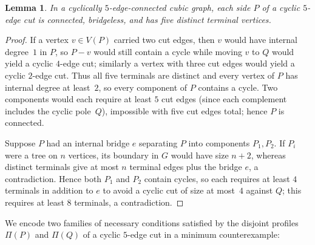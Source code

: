 \documentclass[11pt]{article}
\newtheorem{lemma}[theorem]{Lemma}
\theoremstyle{remark}
\begin{document}
\begin{lemma}\label{lem:pole-connected}
In a cyclically $5$-edge-connected cubic graph, each side $P$ of a cyclic $5$-edge cut is
connected, bridgeless, and has five distinct terminal vertices.
\end{lemma}

\begin{proof}
If a vertex $v \in V(P)$ carried two cut edges, then $v$ would have internal degree~$1$
in $P$, so $P - v$ would still contain a cycle while moving $v$ to $Q$ would yield a
cyclic $4$-edge cut; similarly a vertex with three cut edges would yield a cyclic
$2$-edge cut. Thus all five terminals are distinct and every vertex of $P$ has internal
degree at least~$2$, so every component of $P$ contains a cycle. Two components would
each require at least $5$ cut edges (since each complement includes the cyclic pole~$Q$),
impossible with five cut edges total; hence $P$ is connected.

Suppose $P$ had an internal bridge $e$ separating $P$ into components $P_1, P_2$. If
$P_i$ were a tree on $n$ vertices, its boundary in $G$ would have size $n + 2$, whereas
distinct terminals give at most $n$ terminal edges plus the bridge $e$, a contradiction.
Hence both $P_1$ and $P_2$ contain cycles, so each requires at least $4$ terminals in
addition to $e$ to avoid a cyclic cut of size at most~$4$ against $Q$; this requires at
least $8$ terminals, a contradiction.
\end{proof}

We encode two families of necessary conditions satisfied by the disjoint profiles
$\Pi(P)$ and $\Pi(Q)$ of a cyclic $5$-edge cut in a minimum counterexample:
\end{document}
